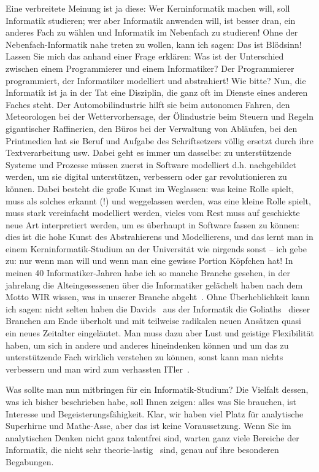 {Eine verbreitete Meinung ist ja diese: Wer Kerninformatik machen will, soll Informatik studieren; wer aber Informatik anwenden will, ist besser dran, ein anderes Fach zu wählen und Informatik im Nebenfach zu studieren! Ohne der Nebenfach-Informatik nahe treten zu wollen, kann ich sagen: Das ist Blödsinn! Lassen Sie mich das anhand einer Frage erklären: Was ist der Unterschied zwischen einem Programmierer und einem Informatiker? Der Programmierer programmiert, der Informatiker modelliert und abstrahiert! Wie bitte? Nun, die Informatik ist ja in der Tat eine Disziplin, die ganz oft im Dienste eines anderen Faches steht. Der Automobilindustrie hilft sie beim autonomen Fahren, den Meteorologen bei der Wettervorhersage, der Ölindustrie beim Steuern und Regeln gigantischer Raffinerien, den Büros bei der Verwaltung von Abläufen, bei den Printmedien hat sie Beruf und Aufgabe des Schriftsetzers völlig ersetzt durch ihre Textverarbeitung usw. Dabei geht es immer um dasselbe: zu unterstützende Systeme und Prozesse müssen zuerst in Software modelliert d.h. \glqq nachgebildet\grqq~ werden, um sie digital unterstützen, verbessern oder gar revolutionieren zu können. Dabei besteht die große Kunst im Weglassen: was keine Rolle spielt, muss als solches erkannt (!) und weggelassen werden, was eine kleine Rolle spielt, muss stark vereinfacht modelliert werden, vieles vom Rest muss auf geschickte neue Art interpretiert werden, um es überhaupt in Software fassen zu können: dies ist die hohe Kunst des Abstrahierens und Modellierens, und das lernt man in einem Kerninformatik-Studium an der Universität wie nirgends sonst -- ich gebe zu: nur wenn man will und wenn man eine gewisse Portion Köpfchen hat! In meinen 40 Informatiker-Jahren habe ich so manche Branche gesehen, in der jahrelang die Alteingesessenen über die Informatiker gelächelt haben nach dem Motto \glqq WIR wissen, was in unserer Branche abgeht\grqq~. Ohne Überheblichkeit kann ich sagen: nicht selten haben die \glqq Davids\grqq~ aus der Informatik die \glqq Goliaths\grqq~ dieser Branchen am Ende überholt und mit teilweise radikalen neuen Ansätzen quasi ein neues Zeitalter eingeläutet. Man muss dazu aber Lust und geistige Flexibilität haben, um sich in andere und anderes hineindenken können und um das zu unterstützende Fach wirklich verstehen zu können, sonst kann man nichts verbessern und man wird zum \glqq verhassten ITler\grqq~.

Was sollte man nun mitbringen für ein Informatik-Studium? Die Vielfalt dessen, was ich bisher beschrieben habe, soll Ihnen zeigen: alles was Sie brauchen, ist Interesse und Begeisterungsfähigkeit. Klar, wir haben viel Platz für analytische Superhirne und Mathe-Asse, aber das ist keine Voraussetzung. Wenn Sie im analytischen Denken nicht ganz talentfrei sind, warten ganz viele Bereiche der Informatik, die nicht \glqq sehr theorie-lastig\grqq~ sind, genau auf ihre besonderen Begabungen.

}
